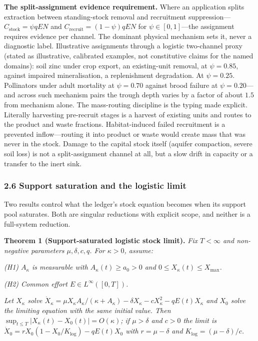 \documentclass[11pt]{article}
\begin{document}
\textbf{The split-assignment evidence requirement.} Where an application splits extraction between standing-stock removal and recruitment suppression---\(C_{\mathrm{stock}} = \psi qEN\) and \(C_{\mathrm{recruit}} = (1-\psi)qEN\) for \(\psi \in [0,1]\)---the assignment requires evidence per channel. The dominant physical mechanism sets it, never a diagnostic label. Illustrative assignments through a logistic two-channel proxy (stated as illustrative, calibrated examples, not constitutive claims for the named domains): soil zinc under crop export, an existing-unit removal, at \(\psi = 0.85\), against impaired mineralisation, a replenishment degradation. At \(\psi = 0.25\). Pollinators under adult mortality at \(\psi = 0.70\) against brood failure at \(\psi = 0.20\)---and across such mechanism pairs the trough depth varies by a factor of about \(1.5\) from mechanism alone. The mass-routing discipline is the typing made explicit. Literally harvesting pre-recruit stages is a harvest of existing units and routes to the product and waste fractions. Habitat-induced failed recruitment is a prevented inflow---routing it into product or waste would create mass that was never in the stock. Damage to the capital stock itself (aquifer compaction, severe soil loss) is not a split-assignment channel at all, but a slow drift in capacity or a transfer to the inert sink.

\subsubsection{2.6 Support saturation and the logistic
limit}\label{support-saturation-and-the-logistic-limit}

Two results control what the ledger's stock equation becomes when its
support pool saturates. Both are singular reductions with explicit
scope, and neither is a full-system reduction.

\textbf{Theorem 1 (Support-saturated logistic stock limit).} \emph{Fix
\(T < \infty\) and non-negative parameters \(\mu, \delta, c, q\). For
\(\kappa > 0\), assume:}

\emph{(H1) \(A_\kappa\) is measurable with \(A_\kappa(t) \ge a_0 > 0\)
and \(0 \le X_\kappa(t) \le X_{\max}\).}

\emph{(H2) Common effort \(E \in L^\infty([0,T])\).}

\emph{Let \(X_\kappa\) solve
\(\dot X_\kappa = \mu X_\kappa A_\kappa/(\kappa + A_\kappa) - \delta X_\kappa - cX_\kappa^2 - qE(t)X_\kappa\)
and \(X_0\) solve the limiting equation with the same initial value.
Then \(\sup_{t \le T} |X_\kappa(t) - X_0(t)| = O(\kappa)\); if
\(\mu > \delta\) and \(c > 0\) the limit is
\(\dot X_0 = rX_0(1 - X_0/\allowbreak{}K_{\log}) - qE(t)X_0\) with
\(r = \mu - \delta\) and \(K_{\log} = (\mu - \delta)/c\).}
\end{document}
